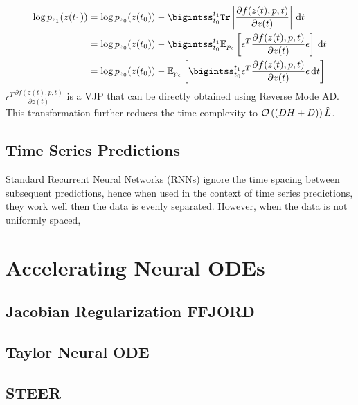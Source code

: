 %
\begin{align}
  \log{p_{z_1}(z(t_1))} & = \log{p_{z_0}(z(t_0))} - \bigintss_{t_0}^{t_1} \texttt{Tr}\left| \frac{\partial f(z(t), p, t)}{\partial z(t)} \right| \, \dt \\
                        & = \log{p_{z_0}(z(t_0))} - \bigintss_{t_0}^{t_1} \mathbb{E}_{p_\epsilon} \left[ \epsilon^T \frac{\partial f(z(t), p, t)}{\partial z(t)} \epsilon \right] \, \dt \\
                        & = \log{p_{z_0}(z(t_0))} - \mathbb{E}_{p_\epsilon} \left[ \bigintss_{t_0}^{t_1} \epsilon^T \frac{\partial f(z(t), p, t)}{\partial z(t)} \epsilon \, \dt \right]
\end{align}
%
$\epsilon^T \frac{\partial f(z(t), p, t)}{\partial z(t)}$ is a VJP that can be directly obtained using Reverse Mode AD. This transformation further reduces the time complexity to $\mathcal{O}\left((DH + D)\right)\hat{L}$.

\subsection{Time Series Predictions}
\label{subsec:time_series_predictions}

Standard Recurrent Neural Networks (RNNs) ignore the time spacing between subsequent predictions, hence when used in the context of time series predictions, they work well then the data is evenly separated. However, when the data is not uniformly spaced, 

\section{Accelerating Neural ODEs}
\label{sec:accelerating_neural_odes_prior_works}

\subsection{Jacobian Regularization FFJORD}
\label{subsec:jacobian_regularization_ffjord}

\subsection{Taylor Neural ODE}
\label{subsec:taylor_neural_odes}



\subsection{STEER}
\label{subsec:steer}

